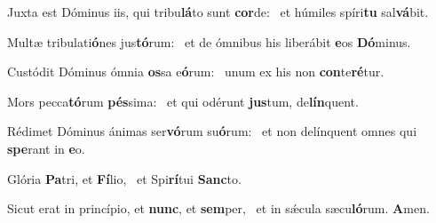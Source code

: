 \item Juxta est Dóminus iis, qui tribu\textbf{lá}to sunt \textbf{cor}de:~\psstar{} et húmiles spíri\textbf{tu} sal\textbf{vá}bit.
\item Multæ tribulati\textbf{ó}nes jus\textbf{tó}\-rum:~\psstar{} et de ómnibus his liberábit \textbf{e}os \textbf{Dó}minus.
\item Custódit Dóminus ómnia \textbf{os}sa e\textbf{ó}rum:~\psstar{} unum ex his non \textbf{con}te\textbf{ré}tur.
\item Mors pecca\textbf{tó}rum \textbf{pés}sima:~\psstar{} et qui odérunt \textbf{jus}tum, de\textbf{lín}quent.
\item Rédimet Dóminus ánimas ser\textbf{vó}rum su\textbf{ó}rum:~\psstar{} et non delínquent omnes qui \textbf{spe}rant in \textbf{e}o.
\item Glória \textbf{Pa}tri, et \textbf{Fí}lio,~\psstar{} et Spi\textbf{rí}tui \textbf{Sanc}to.
\item Sicut erat in princípio, et \textbf{nunc}, et \textbf{sem}per,~\psstar{} et in sǽcula sæcu\textbf{ló}rum. \textbf{A}men.
